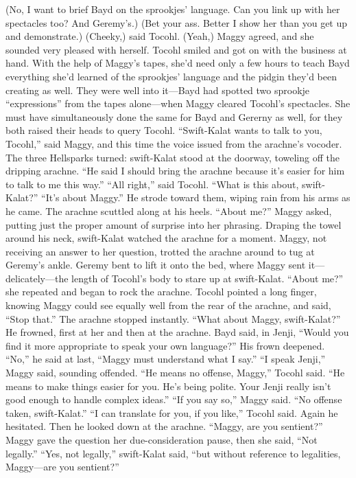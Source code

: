 \documentclass[9pt]{article}
\begin{document}
(No, I want to brief Bayd on the sprookjes’ language. Can you link up with her spectacles too? And
Geremy’s.)
(Bet your ass. Better I show her than you get up and demonstrate.)
(Cheeky,) said Tocohl.
(Yeah,) Maggy agreed, and she sounded very pleased with herself.
Tocohl smiled and got on with the business at hand. With the help of Maggy’s tapes, she’d need only
a few hours to teach Bayd everything she’d learned of the sprookjes’ language and the pidgin they’d
been creating as well.
They were well into it—Bayd had spotted two sprookje “expressions” from the tapes alone—when
Maggy cleared Tocohl’s spectacles. She must have simultaneously done the same for Bayd and Gererny
as well, for they both raised their heads to query Tocohl.
“Swift-Kalat wants to talk to you, Tocohl,” said Maggy, and this time the voice issued from the
arachne’s vocoder. The three Hellsparks turned: swift-Kalat stood at the doorway, toweling off the
dripping arachne. “He said I should bring the arachne because it’s easier for him to talk to me this way.”
“All right,” said Tocohl. “What is this about, swift-Kalat?”
“It’s about Maggy.” He strode toward them, wiping rain from his arms as he came. The arachne
scuttled along at his heels.
“About me?” Maggy asked, putting just the proper amount of surprise into her phrasing.
Draping the towel around his neck, swift-Kalat watched the arachne for a moment. Maggy, not
receiving an answer to her question, trotted the arachne around to tug at Geremy’s ankle. Geremy bent
to lift it onto the bed, where Maggy sent it—delicately—the length of Tocohl’s body to stare up at
swift-Kalat. “About me?” she repeated and began to rock the arachne.
Tocohl pointed a long finger, knowing Maggy could see equally well from the rear of the arachne,
and said, “Stop that.” The arachne stopped instantly. “What about Maggy, swift-Kalat?”
He frowned, first at her and then at the arachne. Bayd said, in Jenji, “Would you find it more
appropriate to speak your own language?”
His frown deepened. “No,” he said at last, “Maggy must understand what I say.”
“I speak Jenji,” Maggy said, sounding offended.
“He means no offense, Maggy,” Tocohl said. “He means to make things easier for you. He’s being
polite. Your Jenji really isn’t good enough to handle complex ideas.”
“If you say so,” Maggy said. “No offense taken, swift-Kalat.”
“I can translate for you, if you like,” Tocohl said.
Again he hesitated. Then he looked down at the arachne. “Maggy, are you sentient?”
Maggy gave the question her due-consideration pause, then she said, “Not legally.”
“Yes, not legally,” swift-Kalat said, “but without reference to legalities, Maggy—are you sentient?”
\end{document}
